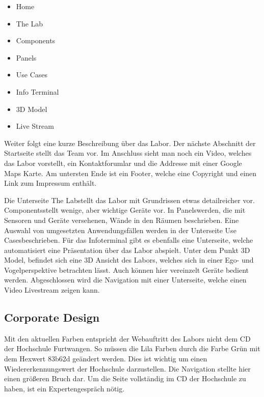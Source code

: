 \begin{itemize}
	\item Home
	
	\item The Lab 
	
	\item Components 
	
	\item Panels
	
	\item Use Cases 
	
	\item Info Terminal
	
	\item 3D Model
	
	\item Live Stream
	
	
	
\end{itemize}

Weiter folgt eine kurze Beschreibung über das Labor. Der nächste Abschnitt der Startseite stellt das Team vor. Im Anschluss sieht man noch ein Video, welches das Labor vorstellt, ein Kontaktforumlar und die Addresse mit einer Google Maps Karte. Am untersten Ende ist ein Footer, welche eine Copyright und einen Link zum Impressum enthält.

Die Unterseite \glqq The Lab\grqq stellt das Labor mit Grundrissen etwas detailreicher vor. \glqq Components\grqq stellt wenige, aber wichtige Geräte vor. In \glqq Panels\grqq werden, die mit Sensoren und Geräte versehenen, Wände in den Räumen beschrieben. Eine Auswahl von umgesetzten Anwendungsfällen werden in der Unterseite \glqq Use Cases\grqq beschrieben. Für das Infoterminal gibt es ebenfalls eine Unterseite, welche automatisiert eine Präsentation über das Labor abspielt. Unter dem Punkt \glqq 3D Model\grqq, befindet sich eine 3D Ansicht des Labors, welches sich in einer Ego- und Vogelperspektive betrachten lässt. Auch können hier vereinzelt Geräte bedient werden. Abgeschlossen wird die Navigation mit einer Unterseite, welche einen Video Livestream zeigen kann.

 

\subsection{Corporate Design}
Mit den aktuellen Farben entspricht der Webauftritt des Labors nicht dem \ac{CD} der Hochschule Furtwangen. So müssen die Lila Farben durch die Farbe Grün mit dem Hexwert 83b62d geändert werden. Dies ist wichtig um einen Wiedererkennungswert der Hochschule darzustellen. Die Navigation stellte hier einen größeren Bruch dar. Um die Seite vollständig im \ac{CD} der Hochschule zu haben, ist ein Expertengespräch nötig.



